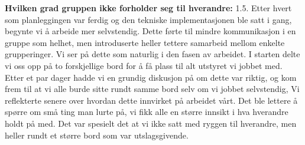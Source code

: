 \noindent \textbf{Hvilken grad gruppen ikke forholder seg til hverandre:} 1.5.
\newline
\noindent Etter hvert som planleggingen var ferdig og den tekniske implementasjonen ble satt i gang, begynte vi å arbeide mer selvstendig. Dette førte til mindre kommunikasjon i en gruppe som helhet, men introduserte heller tettere samarbeid mellom enkelte grupperinger. Vi ser på dette som naturlig i den fasen av arbeidet.
I starten delte vi oss opp på to forskjellige bord for å få plass til alt utstyret vi jobbet med. Etter et par dager hadde vi en grundig diskusjon på om dette var riktig, og kom frem til at vi alle burde sitte rundt samme bord selv om vi jobbet selvstendig, 
Vi reflekterte senere over hvordan dette innvirket på arbeidet vårt. 
Det ble lettere å spørre om små ting man lurte på, vi fikk alle en større innsikt i hva hverandre holdt på med. 
Det var spesielt det at vi ikke satt med ryggen til hverandre, men heller rundt et større bord som var utslagsgivende. 
